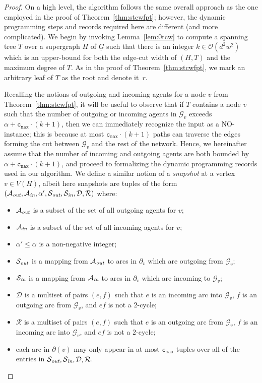 \documentclass[letterpaper]{article} %
\newcommand{\bigoh}{\ensuremath{{\mathcal O}}}
\newcommand{\cmax}{\mathtt{c_{max}}}
\newcommand{\forgottenG}{\mathcal{G}}
\renewcommand{\R}{\mathcal{R}}
\renewcommand{\D}{\mathcal{D}}
\newcommand{\Sout}{\mathcal{S}_\emph{out}}
\newcommand{\Sin}{\mathcal{S}_\emph{in}}
\newcommand{\Aout}{\mathcal{A}_\emph{out}}
\newcommand{\Ain}{\mathcal{A}_\emph{in}}
\begin{document}
\begin{proof}
On a high level, the algorithm follows the same overall approach as the one employed in the proof of Theorem~\ref{thm:stcwfpt}; however, the dynamic programming steps and records required here are different (and more complicated). We begin by invoking Lemma~\ref{lem:0tcw} to compute a spanning tree $T$ over a supergraph $H$ of $\underline G$ such that there is an integer $k\in \bigoh(d^2w^2)$ which is an upper-bound for both the edge-cut width of $(H,T)$ and the maximum degree of $T$. As in the proof of Theorem~\ref{thm:stcwfpt}, we mark an arbitrary leaf of $T$ as the root and denote it~$r$.

Recalling the notions of outgoing and incoming agents for a node $v$ from Theorem~\ref{thm:stcwfpt}, it will be useful to observe that if $T$ contains a node $v$ such that the number of outgoing or incoming agents in $\forgottenG_v$ exceeds $\alpha+\cmax\cdot (k+1)$, then we can immediately recognize the input as a NO-instance; this is because at most $\cmax\cdot (k+1)$ paths can traverse the edges forming the cut between $\forgottenG_v$ and the rest of the network. Hence, we hereinafter assume that the number of incoming and outgoing agents are both bounded by $\alpha+\cmax\cdot (k+1)$, and proceed to formalizing the dynamic programming records used in our algorithm.
We define a similar notion of a \emph{snapshot} at a vertex $v\in V(H)$, albeit here snapshots are tuples of the form $(\Aout,\Ain,\alpha',\Sout,\Sin,\D,\R)$ where:
	\begin{itemize}[topsep=0pt]
\item $\Aout$ is a subset of the set of all outgoing agents for $v$;
\item $\Ain$ is a subset of the set of all incoming agents for $v$;
\item $\alpha'\leq \alpha$ is a non-negative integer;
		\item $\Sout$ is a mapping from $\Aout$ to arcs in $\partial_v$ which are outgoing from $\forgottenG_v$;
		\item $\Sin$ is a mapping from $\Ain$ to arcs in $\partial_v$ which are incoming to $\forgottenG_v$;
		\item $\D$ is a multiset of pairs $(e,f)$ such that $e$ is an incoming arc into $\forgottenG_v$, $f$ is an outgoing arc from $\forgottenG_v$, and $ef$ is not a $2$-cycle;
		\item $\R$ is a multiset of pairs $(e,f)$ such that $e$ is an outgoing arc from $\forgottenG_v$, $f$ is an incoming arc into $\forgottenG_v$, and $ef$ is not a $2$-cycle;
		\item each arc in $\partial(v)$ may only appear in at most $\cmax$ tuples over all of the entries in $\Sout, \Sin, \D, \R$.
	\end{itemize}


\end{proof}
\end{document}
